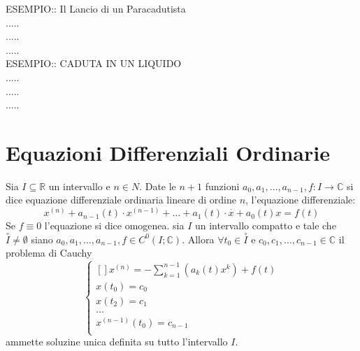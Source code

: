 ESEMPIO:: Il Lancio di un Paracadutista\\
.....\\
.....\\
.....\\
ESEMPIO:: CADUTA IN UN LIQUIDO\\
.....\\
.....\\
.....\\
\section{Equazioni Differenziali Ordinarie}
Sia $I\subseteq\mathbb{R}$ un intervallo e $n\in N$. Date le $n+1$ funzioni $a_0,a_1,\ldots,a_{n-1}, f:I\to\mathbb{C}$ si dice equazione differenziale ordinaria lineare di ordine $n$, l'equazione differenziale:
$$x^{(n)}+a_{n-1}(t)\cdot x^{(n-1)}+\ldots+a_1(t)\cdot\overset{\cdot}{x}+a_0(t)x=f(t)$$
Se $f\equiv 0 $ l'equazione si dice omogenea.
\proposition
sia $I$ un intervallo compatto e tale che $\overset{\circ}{I}\ne \emptyset$ siano $a_0,a_1,\ldots,a_{n-1},f\in C^0(I;\mathbb{C})$. Allora $\forall t_0\in\overset{\circ}{I}$ e $c_0,c_1,\ldots,c_{n-1}\in\mathbb{C}$ il problema di Cauchy 
$$ \left\{\begin{matrix}[]
x^{(n)}=-\sum\limits_{k=1}^{n-1}\left(a_k(t)x^k\right)+f(t)\\
x(t_0)=c_0\\
x(t_2)=c_1\\
\ldots\\
x^{(n-1)}(t_0)=c_{n-1}\\
\end{matrix}\right.$$
ammette soluzine unica definita su tutto l'intervallo $I$.
